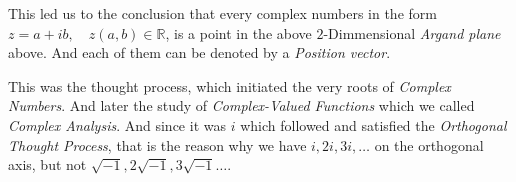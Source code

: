 This led us to the conclusion that every complex numbers in the form $z = a + ib, \quad z (a, b) \in \mathbb{R}$, is a point in the above $2$-Dimmensional \emph{Argand plane} above. And each of them can be denoted by a \emph{Position vector}.

This was the thought process, which initiated the very roots of \emph{Complex Numbers}. And later the study of \emph{Complex-Valued Functions} which we called \emph{Complex Analysis}.
And since it was $i$ which followed and satisfied the \emph{Orthogonal Thought Process}, that is the reason why we have $i, 2i, 3i, \dots$ on the orthogonal axis, but not $\sqrt{-1}, 2\sqrt{-1}, 3\sqrt{-1} \dots$.
